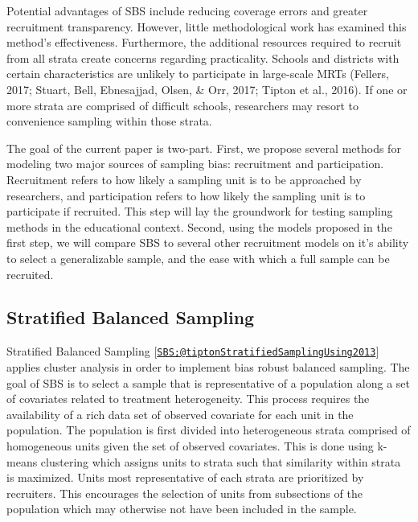 \documentclass[man,floatsintext]{apa6}
\begin{document}
Potential advantages of SBS include reducing coverage errors and greater recruitment transparency. However, little methodological work has examined this method's effectiveness. Furthermore, the additional resources required to recruit from all strata create concerns regarding practicality. Schools and districts with certain characteristics are unlikely to participate in large-scale MRTs (Fellers, 2017; Stuart, Bell, Ebnesajjad, Olsen, \& Orr, 2017; Tipton et al., 2016). If one or more strata are comprised of difficult schools, researchers may resort to convenience sampling within those strata.

The goal of the current paper is two-part. First, we propose several methods for modeling two major sources of sampling bias: recruitment and participation. Recruitment refers to how likely a sampling unit is to be approached by researchers, and participation refers to how likely the sampling unit is to participate if recruited. This step will lay the groundwork for testing sampling methods in the educational context. Second, using the models proposed in the first step, we will compare SBS to several other recruitment models on it's ability to select a generalizable sample, and the ease with which a full sample can be recruited.

\hypertarget{stratified-balanced-sampling}{%
\subsection{Stratified Balanced Sampling}\label{stratified-balanced-sampling}}

Stratified Balanced Sampling {[}\href{mailto:SBS;@tiptonStratifiedSamplingUsing2013}{\nolinkurl{SBS;@tiptonStratifiedSamplingUsing2013}}{]} applies cluster analysis in order to implement bias robust balanced sampling. The goal of SBS is to select a sample that is representative of a population along a set of covariates related to treatment heterogeneity. This process requires the availability of a rich data set of observed covariate for each unit in the population. The population is first divided into heterogeneous strata comprised of homogeneous units given the set of observed covariates. This is done using k-means clustering which assigns units to strata such that similarity within strata is maximized. Units most representative of each strata are prioritized by recruiters. This encourages the selection of units from subsections of the population which may otherwise not have been included in the sample.
\end{document}
